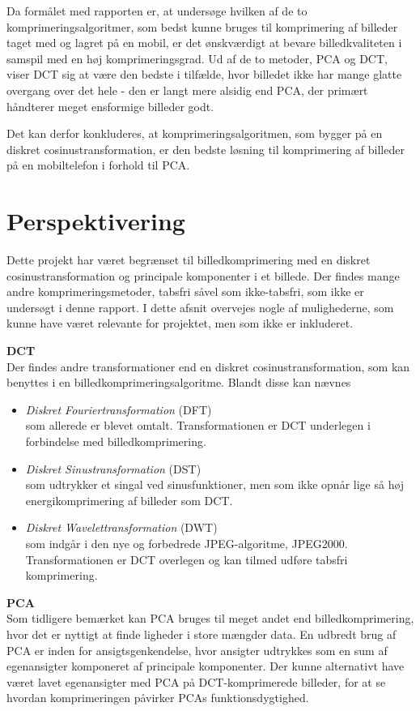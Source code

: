 Da formålet med rapporten er, at undersøge hvilken af de to komprimeringsalgoritmer, som bedst kunne bruges til komprimering af billeder taget med og lagret på en mobil, er det ønskværdigt at bevare billedkvaliteten i samspil med en høj komprimeringsgrad. Ud af de to metoder, PCA og DCT, viser DCT sig at være den bedste i tilfælde, hvor billedet ikke har mange glatte overgang over det hele - den er langt mere alsidig end PCA, der primært håndterer meget ensformige billeder godt.

Det kan derfor konkluderes, at komprimeringsalgoritmen, som bygger på en diskret cosinustransformation, er den bedste løsning til komprimering af billeder på en mobiltelefon i forhold til PCA.

\section{Perspektivering}
Dette projekt har været begrænset til billedkomprimering med en diskret cosinustransformation og principale komponenter i et billede. Der findes mange andre komprimeringsmetoder, tabsfri såvel som ikke-tabsfri, som ikke er undersøgt i denne rapport. I dette afsnit overvejes nogle af mulighederne, som kunne have været relevante for projektet, men som ikke er inkluderet.

\textbf{DCT}\\
Der findes andre transformationer end en diskret cosinustransformation, som kan benyttes i en billedkomprimeringsalgoritme. Blandt disse kan nævnes
\begin{itemize}
	\item[]{\textit{Diskret Fouriertransformation} (DFT)\\
	som allerede er blevet omtalt. Transformationen er DCT underlegen i forbindelse med billedkomprimering.}\\
	\item[]{\textit{Diskret Sinustransformation} (DST)\\
	som udtrykker et singal ved sinusfunktioner, men som ikke opnår lige så høj energikomprimering af billeder som DCT.}\\
	\item[]{\textit{Diskret Wavelettransformation} (DWT)\\
	som indgår i den nye og forbedrede JPEG-algoritme, JPEG2000. Transformationen er DCT overlegen og kan tilmed udføre tabsfri komprimering.}
\end{itemize}

\textbf{PCA}\\
Som tidligere bemærket kan PCA bruges til meget andet end billedkomprimering, hvor det er nyttigt at finde ligheder i store mængder data. En udbredt brug af PCA er inden for ansigtsgenkendelse, hvor ansigter udtrykkes som en sum af egenansigter komponeret af principale komponenter. Der kunne alternativt have været lavet egenansigter med PCA på DCT-komprimerede billeder, for at se hvordan komprimeringen påvirker PCAs funktionsdygtighed.

